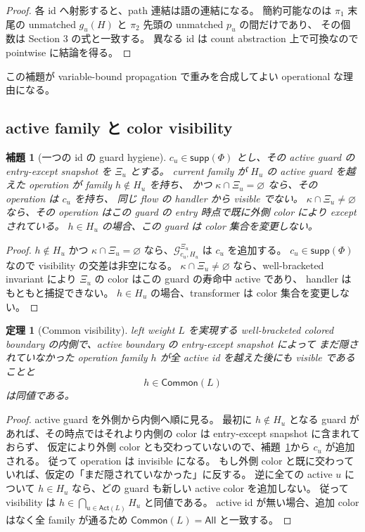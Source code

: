 \documentclass[uplatex,dvipdfmx,a4paper,10.5pt]{jsarticle}
\theoremstyle{jpplain}
\newtheorem{lemma}[definition]{補題}
\newtheorem{theorem}[definition]{定理}
\newcommand{\All}{\mathsf{All}}
\newcommand{\Common}{\mathsf{Common}}
\newcommand{\supp}{\mathsf{supp}}
\newcommand{\Guard}{\mathcal G}
\begin{document}
\begin{proof}
各 id へ射影すると、path 連結は語の連結になる。
簡約可能なのは $\pi_1$ 末尾の unmatched $g_u(H)$ と $\pi_2$ 先頭の unmatched $p_u$ の間だけであり、
その個数は Section 3 の式と一致する。
異なる id は count abstraction 上で可換なので pointwise に結論を得る。
\end{proof}

この補題が variable-bound propagation で重みを合成してよい operational な理由になる。

\subsection{active family と color visibility}

\begin{lemma}[一つの id の guard hygiene]\label{lem:one-color-hygiene}
$c_u\in\supp(\Phi)$ とし、その active guard の entry-except snapshot を $\Xi_u$ とする。
current family が $H_u$ の active guard を越えた operation が family $h\notin H_u$ を持ち、
かつ $\kappa\cap\Xi_u=\varnothing$ なら、その operation は $c_u$ を持ち、
同じ flow の handler から visible でない。
$\kappa\cap\Xi_u\neq\varnothing$ なら、その operation はこの guard の entry 時点で既に外側 color により except されている。
$h\in H_u$ の場合、この guard は color 集合を変更しない。
\end{lemma}

\begin{proof}
$h\notin H_u$ かつ $\kappa\cap\Xi_u=\varnothing$ なら、$\Guard_{c_u,H_u}^{\Xi_u}$ は $c_u$ を追加する。
$c_u\in\supp(\Phi)$ なので visibility の交差は非空になる。
$\kappa\cap\Xi_u\neq\varnothing$ なら、well-bracketed invariant により $\Xi_u$ の color はこの guard の寿命中 active であり、
handler はもともと捕捉できない。
$h\in H_u$ の場合、transformer は color 集合を変更しない。
\end{proof}

\begin{theorem}[Common visibility]\label{thm:common-visibility}
left weight $L$ を実現する well-bracketed colored boundary の内側で、active boundary の entry-except snapshot によって
まだ隠されていなかった operation family $h$ が全 active id を越えた後にも visible であることと
\[
  h\in\Common(L)
\]
は同値である。
\end{theorem}

\begin{proof}
active guard を外側から内側へ順に見る。
最初に $h\notin H_u$ となる guard があれば、その時点ではそれより内側の color は entry-except snapshot に含まれておらず、
仮定により外側 color とも交わっていないので、補題~\ref{lem:one-color-hygiene}から $c_u$ が追加される。
従って operation は invisible になる。
もし外側 color と既に交わっていれば、仮定の「まだ隠されていなかった」に反する。
逆に全ての active $u$ について $h\in H_u$ なら、どの guard も新しい active color を追加しない。
従って visibility は
$h\in\bigcap_{u\in\mathsf{Act}(L)}H_u$ と同値である。
active id が無い場合、追加 color はなく全 family が通るため $\Common(L)=\All$ と一致する。
\end{proof}
\end{document}
